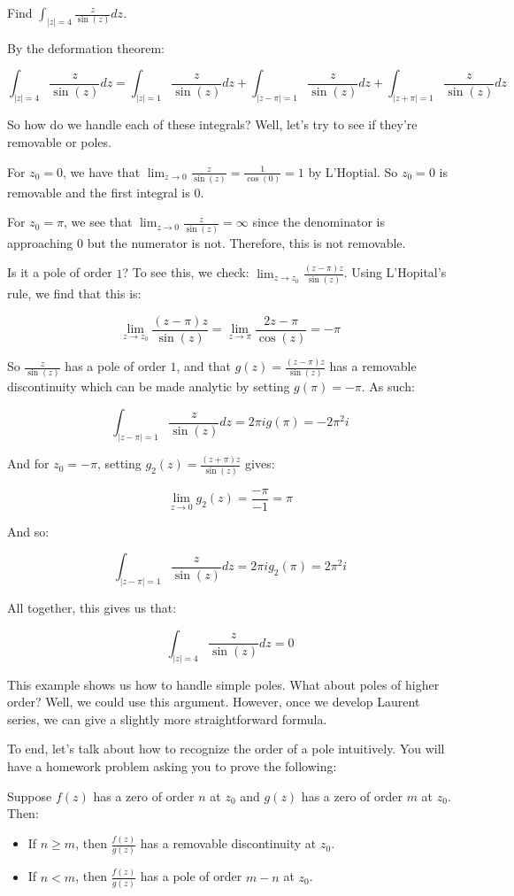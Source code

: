 \begin{ex}{}{} Find $\int_{|z| = 4} \frac{z}{\sin(z)}dz$.

By the deformation theorem:

$$\int_{|z| = 4}\frac{z}{\sin(z)}dz = \int_{|z| = 1} \frac{z}{\sin(z)}dz + \int_{|z-\pi| = 1} \frac{z}{\sin(z)}dz + \int_{|z+\pi| = 1}\frac{z}{\sin(z)}dz$$

So how do we handle each of these integrals? Well, let's try to see if they're removable or poles.

For $z_0 = 0$, we have that $\lim_{z\rightarrow 0} \frac{z}{\sin(z)} = \frac{1}{\cos(0)} = 1$ by L'Hoptial. So $z_0 = 0$ is removable and the first integral is $0$.

For $z_0 = \pi$, we see that $\lim_{z\rightarrow 0} \frac{z}{\sin(z)} = \infty$ since the denominator is approaching $0$ but the numerator is not. Therefore, this is not removable.

Is it a pole of order $1$? To see this, we check: $\lim_{z\rightarrow z_0} \frac{(z-\pi)z}{\sin(z)}$. Using L'Hopital's rule, we find that this is:


$$\lim_{z\rightarrow z_0} \frac{(z-\pi)z}{\sin(z)} = \lim_{z\rightarrow \pi} \frac{2z - \pi}{\cos(z)} = -\pi$$

So $\frac{z}{\sin(z)}$ has a pole of order $1$, and that $g(z) = \frac{(z-\pi)z}{\sin(z)}$ has a removable discontinuity which can be made analytic by setting $g(\pi) = -\pi$. As such:

$$\int_{|z-\pi| = 1} \frac{z}{\sin(z)}dz = 2\pi ig(\pi) = -2\pi^2 i$$

And for $z_0 = -\pi$, setting $g_2(z) = \frac{(z + \pi)z}{\sin(z)}$ gives:

$$\lim_{z\rightarrow 0} g_2(z) = \frac{-\pi}{-1} = \pi$$

And so:

$$\int_{|z-\pi| = 1} \frac{z}{\sin(z)}dz = 2\pi ig_2(\pi) = 2\pi^2 i$$

All together, this gives us that:

$$\int_{|z| = 4}\frac{z}{\sin(z)}dz =0$$
\end{ex}

This example shows us how to handle simple poles. What about poles of higher order? Well, we could use this argument. However, once we develop Laurent series, we can give a slightly more straightforward formula.

To end, let's talk about how to recognize the order of a pole intuitively. You will have a homework problem asking you to prove the following:

\begin{thmbo}{}{} Suppose $f(z)$ has a zero of order $n$ at $z_0$ and $g(z)$ has a zero of order $m$ at $z_0$. Then:

\begin{itemize}
\item If $n \ge m$, then $\frac{f(z)}{g(z)}$ has a removable discontinuity at $z_0$.
\item If $n < m$, then $\frac{f(z)}{g(z)}$ has a pole of order $m-n$ at $z_0$.
\end{itemize}
\end{thmbo}
